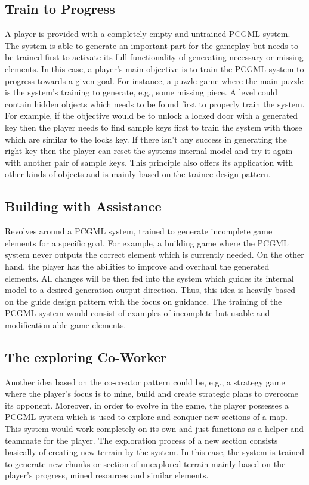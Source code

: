 \documentclass[MGS,Master,english]{twbook}%
\begin{document}
\subsection{Train to Progress} \label{idea::trainToProgress}
A player is provided with a completely empty and untrained PCGML system. The system is able to generate an important part for the gameplay but needs to be trained first to activate its full functionality of generating necessary or missing elements. In this case, a player's main objective is to train the PCGML system to progress towards a given goal. For instance, a puzzle game where the main puzzle is the system's training to generate, e.g., some missing piece. A level could contain hidden objects which needs to be found first to properly train the system. \\
For example, if the objective would be to unlock a locked door with a generated key then the player needs to find sample keys first to train the system with those which are similar to the locks key. If there isn't any success in generating the right key then the player can reset the systems internal model and try it again with another pair of sample keys. This principle also offers its application with other kinds of objects and is mainly based on the trainee design pattern.

\subsection{Building with Assistance} \label{idea::buildingWithAssistance}
Revolves around a PCGML system, trained to generate incomplete game elements for a specific goal. For example, a building game where the PCGML system never outputs the correct element which is currently needed. On the other hand, the player has the abilities to improve and overhaul the generated elements. All changes will be then fed into the system which guides its internal model to a desired generation output direction. Thus, this idea is heavily  based on the guide design pattern with the focus on guidance. The training of the PCGML system would consist of examples of incomplete but usable and modification able game elements.

\subsection{The exploring Co-Worker} \label{idea::exploringCoWorker}
Another idea based on the co-creator pattern could be, e.g., a strategy game where the player's focus is to mine, build and create strategic plans to overcome its opponent. Moreover, in order to evolve in the game, the player possesses a PCGML system which is used to explore and conquer new sections of a map. This system would work completely on its own and just functions as a helper and teammate for the player. The exploration process of a new section consists basically of creating new terrain by the system. In this case, the system is trained to generate new chunks or section of unexplored terrain mainly based on the player's progress, mined resources and similar elements.
\end{document}
